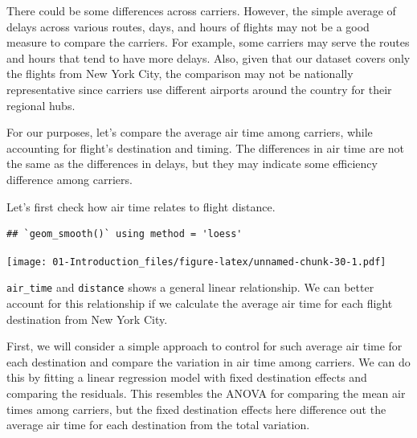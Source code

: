 \documentclass[]{book}
\newenvironment{Shaded}{\begin{snugshade}}{\end{snugshade}}
\newcommand{\KeywordTok}[1]{\textcolor[rgb]{0.13,0.29,0.53}{\textbf{{#1}}}}
\newcommand{\DataTypeTok}[1]{\textcolor[rgb]{0.13,0.29,0.53}{{#1}}}
\newcommand{\DecValTok}[1]{\textcolor[rgb]{0.00,0.00,0.81}{{#1}}}
\newcommand{\FloatTok}[1]{\textcolor[rgb]{0.00,0.00,0.81}{{#1}}}
\newcommand{\StringTok}[1]{\textcolor[rgb]{0.31,0.60,0.02}{{#1}}}
\newcommand{\NormalTok}[1]{{#1}}
\theoremstyle{definition}
\theoremstyle{definition}
\theoremstyle{remark}
\begin{document}
There could be some differences across carriers. However, the simple
average of delays across various routes, days, and hours of flights may
not be a good measure to compare the carriers. For example, some
carriers may serve the routes and hours that tend to have more delays.
Also, given that our dataset covers only the flights from New York City,
the comparison may not be nationally representative since carriers use
different airports around the country for their regional hubs.

For our purposes, let's compare the average air time among carriers,
while accounting for flight's destination and timing. The differences in
air time are not the same as the differences in delays, but they may
indicate some efficiency difference among carriers.

Let's first check how air time relates to flight distance.

\begin{Shaded}
\end{Shaded}

\begin{verbatim}
## `geom_smooth()` using method = 'loess'
\end{verbatim}

\texttt{[image: 01-Introduction\_files/figure-latex/unnamed-chunk-30-1.pdf]}

\texttt{air\_time} and \texttt{distance} shows a general linear
relationship. We can better account for this relationship if we
calculate the average air time for each flight destination from New York
City.

First, we will consider a simple approach to control for such average
air time for each destination and compare the variation in air time
among carriers. We can do this by fitting a linear regression model with
fixed destination effects and comparing the residuals. This resembles
the ANOVA for comparing the mean air times among carriers, but the fixed
destination effects here difference out the average air time for each
destination from the total variation.
\end{document}
